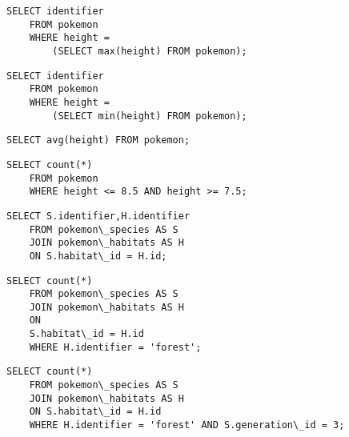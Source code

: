 \question{}
\begin{lstlisting}
SELECT identifier 
	FROM pokemon 
	WHERE height = 
		(SELECT max(height) FROM pokemon);
\end{lstlisting}

\begin{lstlisting}
SELECT identifier 
	FROM pokemon 
	WHERE height = 
		(SELECT min(height) FROM pokemon); 
\end{lstlisting}


\question{}
\begin{lstlisting}
SELECT avg(height) FROM pokemon;
\end{lstlisting}
 
\question{}
\begin{lstlisting}
SELECT count(*) 
	FROM pokemon 
	WHERE height <= 8.5 AND height >= 7.5;
\end{lstlisting}

\question{}
\begin{lstlisting}
SELECT S.identifier,H.identifier 
	FROM pokemon\_species AS S 
	JOIN pokemon\_habitats AS H 
	ON S.habitat\_id = H.id;
\end{lstlisting}


\question{}
\begin{lstlisting}
SELECT count(*) 
	FROM pokemon\_species AS S 
	JOIN pokemon\_habitats AS H 
	ON 
	S.habitat\_id = H.id 
	WHERE H.identifier = 'forest';
\end{lstlisting}  


\question{}
\begin{lstlisting}
SELECT count(*) 
	FROM pokemon\_species AS S 
	JOIN pokemon\_habitats AS H 
	ON S.habitat\_id = H.id 
	WHERE H.identifier = 'forest' AND S.generation\_id = 3;
\end{lstlisting} 


